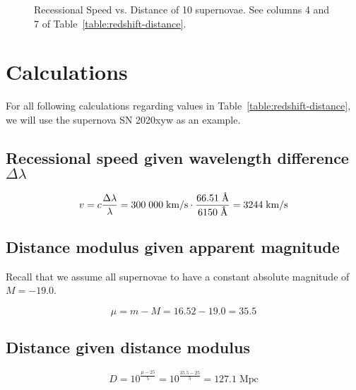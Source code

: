 \documentclass[11pt]{article}
\begin{document}
\begin{figure}
\caption{Recessional Speed vs. Distance of 10 supernovae. See columns 4 and 7 of Table~\ref{table:redshift-distance}.}
\label{graph:speedvdistance}
\end{figure}


\section{Calculations} \label{calculations}
For all following calculations regarding values in Table~\ref{table:redshift-distance}, we will use the supernova SN 2020xyw as an example.

\subsection*{Recessional speed given wavelength difference $\Delta\lambda$}
\[v = c \frac{\Delta\lambda}{\lambda} = 300\;000\;\textrm{km/s} \cdot \frac{66.51\;\textrm{\r{A}}}{6150\;\textrm{\r{A}}} = 3 244\;\textrm{km/s}\]

\subsection*{Distance modulus given apparent magnitude}
Recall that we assume all supernovae to have a constant absolute magnitude of $M = -19.0$.

\[\mu = m - M = 16.52 - 19.0 = 35.5\]

\subsection*{Distance given distance modulus}
\[D = 10^\frac{\mu - 25}{5} = 10^\frac{35.5 - 25}{5} = 127.1\;\textrm{Mpc}\]
\end{document}
